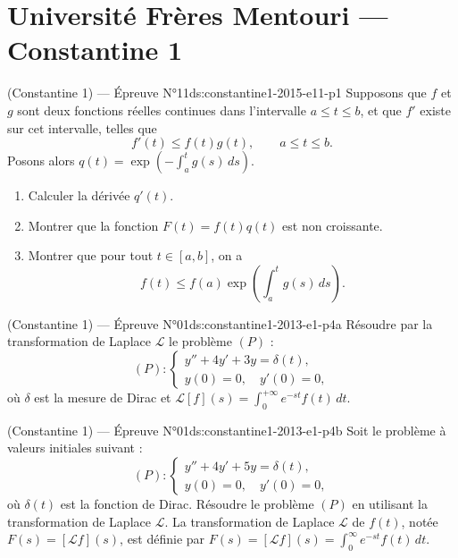 \section{Université Frères Mentouri --- Constantine 1}
\begin{problem}{(Constantine 1) — Épreuve N°11}{ds:constantine1-2015-e11-p1}
Supposons que $f$ et $g$ sont deux fonctions réelles continues dans l'intervalle $a\le t\le b$, et que $f'$ existe sur cet intervalle, telles que
$$f'(t)\le f(t)g(t),\qquad a\le t\le b.\tag{1}$$
Posons alors $q(t)=\exp\left(-\int_a^tg(s)\,ds\right)$.
\begin{enumerate}\item Calculer la dérivée $q'(t)$.\item Montrer que la fonction $F(t)=f(t)q(t)$ est non croissante.\item Montrer que pour tout $t\in[a,b]$, on a
$$f(t)\le f(a)\exp\left(\int_a^tg(s)\,ds\right).$$\end{enumerate}
\end{problem}
\newpage
\begin{problem}{(Constantine 1) — Épreuve N°01}{ds:constantine1-2013-e1-p4a}
Résoudre par la transformation de Laplace $\mathcal L$ le problème $(P)$ :
$$(P):\begin{cases}y''+4y'+3y=\delta(t),\\ y(0)=0,\quad y'(0)=0,\end{cases}$$
où $\delta$ est la mesure de Dirac et $\mathcal L[f](s)=\int_0^{+\infty}e^{-st}f(t)\,dt$.
\end{problem}
\newpage
\begin{problem}{(Constantine 1) — Épreuve N°01}{ds:constantine1-2013-e1-p4b}
Soit le problème à valeurs initiales suivant :
$$(P):\begin{cases}y''+4y'+5y=\delta(t),\\ y(0)=0,\quad y'(0)=0,\end{cases}$$
où $\delta(t)$ est la fonction de Dirac. Résoudre le problème $(P)$ en utilisant la transformation de Laplace $\mathcal L$. La transformation de Laplace $\mathcal L$ de $f(t)$, notée $F(s)=[\mathcal Lf](s)$, est définie par $F(s)=[\mathcal Lf](s)=\int_0^\infty e^{-st}f(t)\,dt$.
\end{problem}


